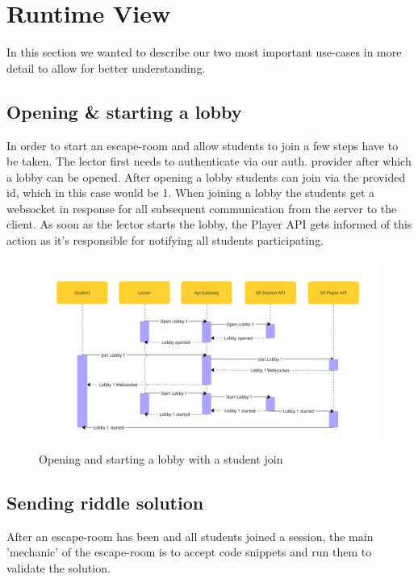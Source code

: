 \hypertarget{section-runtime-view}{%
\section{Runtime View}\label{section-runtime-view}}
In this section we wanted to describe our two most important use-cases in more detail to allow for better understanding.

\subsection{Opening \& starting a lobby}
In order to start an escape-room and allow students to join a few steps have to be taken. The lector first needs to authenticate via our auth. provider after which a lobby can be opened. After opening a lobby students can join via the provided id, which in this case would be 1. When joining a lobby the students get a websocket in response for all subsequent communication from the server to the client. As soon as the lector starts the lobby, the Player API gets informed of this action as it's responsible for notifying all students participating.
\begin{figure}[h!]
    \centering
    \includegraphics[width=1\linewidth]{images/Sequence Diagrams/SEP1 - EscapeDOOM - Open Lobby - Start Lobby.jpg}
    \caption{Opening and starting a lobby with a student join}
    \label{fig:sequenceDiag:openAndStart}
\end{figure}

\newpage

\subsection{Sending riddle solution}

After an escape-room has been and all students joined a session, the main 'mechanic' of the escape-room is to accept code snippets and run them to validate the solution.

